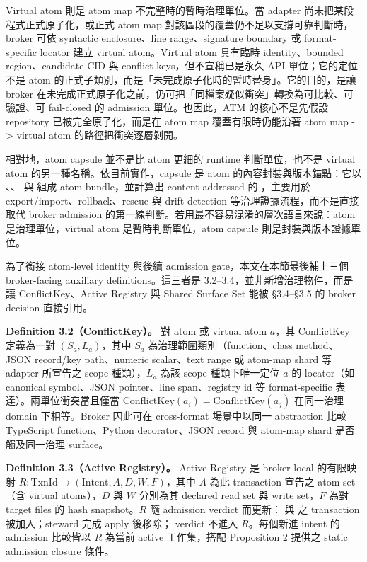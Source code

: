 \documentclass[a4paper,fontset=none]{ctexart}
\begin{document}
Virtual atom 則是 atom map 不完整時的暫時治理單位。當 adapter 尚未把某段程式正式原子化，或正式 atom map 對該區段的覆蓋仍不足以支撐可靠判斷時，broker 可依 syntactic enclosure、line range、signature boundary 或 format-specific locator 建立 virtual atom。Virtual atom 具有臨時 identity、bounded region、candidate CID 與 conflict keys，但不宣稱已是永久 API 單位；它的定位不是 atom 的正式子類別，而是「未完成原子化時的暫時替身」。它的目的，是讓 broker 在未完成正式原子化之前，仍可把「同檔案疑似衝突」轉換為可比較、可驗證、可 fail-closed 的 admission 單位。也因此，ATM 的核心不是先假設 repository 已被完全原子化，而是在 atom map 覆蓋有限時仍能沿著 atom map -> virtual atom 的路徑把衝突逐層剝開。

相對地，atom capsule 並不是比 atom 更細的 runtime 判斷單位，也不是 virtual atom 的另一種名稱。依目前實作，capsule 是 atom 的內容封裝與版本錨點：它以 \texttt{}、\texttt{}、\texttt{} 與 \texttt{} 組成 atom bundle，並計算出 content-addressed 的 \texttt{}，主要用於 export/import、rollback、rescue 與 drift detection 等治理證據流程，而不是直接取代 broker admission 的第一線判斷。若用最不容易混淆的層次語言來說：atom 是治理單位，virtual atom 是暫時判斷單位，atom capsule 則是封裝與版本證據單位。

為了銜接 atom-level identity 與後續 admission gate，本文在本節最後補上三個 broker-facing auxiliary definitions。這三者是 3.2--3.4，並非新增治理物件，而是讓 ConflictKey、Active Registry 與 Shared Surface Set 能被 §3.4--§3.5 的 broker decision 直接引用。

\textbf{Definition 3.2（ConflictKey）。} 對 atom 或 virtual atom $a$，其 ConflictKey 定義為一對 $(S_a, L_a)$，其中 $S_a$ 為治理範圍類別（function、class method、JSON record/key path、numeric scalar、text range 或 atom-map shard 等 adapter 所宣告之 scope 種類），$L_a$ 為該 scope 種類下唯一定位 $a$ 的 locator（如 canonical symbol、JSON pointer、line span、registry id 等 format-specific 表達）。兩單位衝突當且僅當 $\text{ConflictKey}(a_i) = \text{ConflictKey}(a_j)$ 在同一治理 domain 下相等。Broker 因此可在 cross-format 場景中以同一 abstraction 比較 TypeScript function、Python decorator、JSON record 與 atom-map shard 是否觸及同一治理 surface。

\textbf{Definition 3.3（Active Registry）。} Active Registry 是 broker-local 的有限映射 $R : \text{TxnId} \to (\text{Intent}, A, D, W, F)$，其中 $A$ 為此 transaction 宣告之 atom set（含 virtual atoms），$D$ 與 $W$ 分別為其 declared read set 與 write set，$F$ 為對 target files 的 hash snapshot。$R$ 隨 admission verdict 而更新：\texttt{} 與 \texttt{} 之 transaction 被加入；steward 完成 apply 後移除；\texttt{} verdict 不進入 $R$。每個新進 intent 的 admission 比較皆以 $R$ 為當前 active 工作集，搭配 Proposition 2 提供之 static admission closure 條件。
\end{document}

